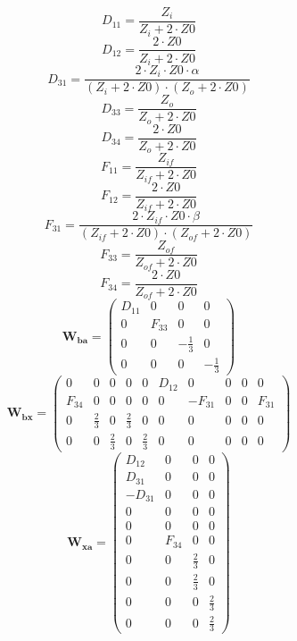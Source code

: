 \[ D_{11}={\scriptstyle \frac{Z_i}{Z_i+2\cdot Z0}} \]
\[ D_{12}={\scriptstyle \frac{2\cdot Z0}{Z_i+2\cdot Z0}} \]
\[ D_{31}={\scriptstyle \frac{2\cdot Z_i\cdot Z0\cdot
\alpha}{\left(Z_i+2\cdot Z0\right)\cdot\left(Z_o+2\cdot Z0\right)}} \]
\[ D_{33}={\scriptstyle \frac{Z_o}{Z_o+2\cdot Z0}} \]
\[ D_{34}={\scriptstyle \frac{2\cdot Z0}{Z_o+2\cdot Z0}} \]
\[ F_{11}={\scriptstyle \frac{Z_{if}}{Z_{if}+2\cdot Z0}} \]
\[ F_{12}={\scriptstyle \frac{2\cdot Z0}{Z_{if}+2\cdot Z0}} \]
\[ F_{31}={\scriptstyle \frac{2\cdot Z_{if}\cdot Z0\cdot
\beta}{\left(Z_{if}+2\cdot Z0\right)\cdot\left(Z_{of}+2\cdot
Z0\right)}} \]
\[ F_{33}={\scriptstyle \frac{Z_{of}}{Z_{of}+2\cdot Z0}} \]
\[ F_{34}={\scriptstyle \frac{2\cdot Z0}{Z_{of}+2\cdot Z0}} \]
\[ \mathbf{W_{ba}} = \left(\begin{smallmatrix} D_{11} & 0 & 0 & 0 \\ 0
& F_{33} & 0 & 0 \\ 0 & 0 & -\frac{1}{3} & 0 \\ 0 & 0 & 0 &
-\frac{1}{3} \end{smallmatrix}\right) \]
\[ \mathbf{W_{bx}} = \left(\begin{smallmatrix} 0 & 0 & 0 & 0 & 0 &
D_{12} & 0 & 0 & 0 & 0 \\ F_{34} & 0 & 0 & 0 & 0 & 0 & -F_{31} & 0 & 0
& F_{31} \\ 0 & \frac{2}{3} & 0 & \frac{2}{3} & 0 & 0 & 0 & 0 & 0 & 0
\\ 0 & 0 & \frac{2}{3} & 0 & \frac{2}{3} & 0 & 0 & 0 & 0 & 0
\end{smallmatrix}\right) \]
\[ \mathbf{W_{xa}} = \left(\begin{smallmatrix} D_{12} & 0 & 0 & 0 \\
D_{31} & 0 & 0 & 0 \\ -D_{31} & 0 & 0 & 0 \\ 0 & 0 & 0 & 0 \\ 0 & 0 &
0 & 0 \\ 0 & F_{34} & 0 & 0 \\ 0 & 0 & \frac{2}{3} & 0 \\ 0 & 0 &
\frac{2}{3} & 0 \\ 0 & 0 & 0 & \frac{2}{3} \\ 0 & 0 & 0 & \frac{2}{3}
\end{smallmatrix}\right) \]
